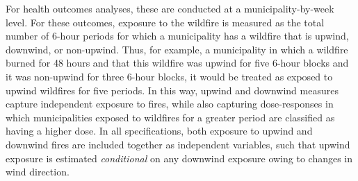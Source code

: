 \documentclass[11pt]{article}
\begin{document}
\begin{spacing}{1.3}
For health  outcomes analyses, these are conducted at a municipality-by-week level. For these outcomes, exposure to the wildfire is measured as the total number of 6-hour periods for which a municipality has a wildfire that is upwind, downwind, or non-upwind. Thus, for example, a municipality in which a wildfire burned for 48 hours and that this wildfire was upwind for five 6-hour blocks and it was non-upwind for three 6-hour blocks, it would be treated as exposed to upwind wildfires for five periods. In this way, upwind and downwind measures capture independent exposure to fires, while also capturing dose-responses in which municipalities exposed to wildfires for a greater period are classified as having a higher dose.  In all specifications, both exposure to upwind and downwind fires are included together as independent variables, such that upwind exposure is estimated \emph{conditional} on any downwind exposure owing to changes in wind direction.  


 

\end{spacing}
\end{document}
